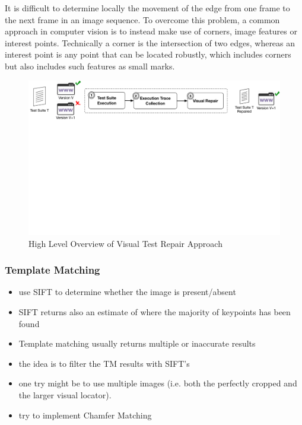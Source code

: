 It is difficult to determine locally the movement of the edge from one frame to the next frame in an image sequence. 
To overcome this problem, a common approach in computer vision is to instead make use of corners, image features or interest points.
Technically a corner is the intersection of two edges, whereas an interest point is any point that can be located robustly, which includes corners but also includes such features as small marks.

\begin{figure}[t]
\centering
\includegraphics[trim={0.0cm 18cm 0.0cm 0cm},clip,scale=0.435]{images/approach-reduced2}
\caption{High Level Overview of Visual Test Repair Approach}
\label{approach}
\end{figure}


\subsubsection{Template Matching}

\begin{itemize}
\item use SIFT to determine whether the image is present/absent
\item SIFT returns also an estimate of where the majority of keypoints has been found
\item Template matching usually returns multiple or inaccurate results
\item the idea is to filter the TM results with SIFT's
\item one try might be to use multiple images (i.e. both the perfectly cropped and the larger visual locator).
\item try to implement Chamfer Matching
\end{itemize}

